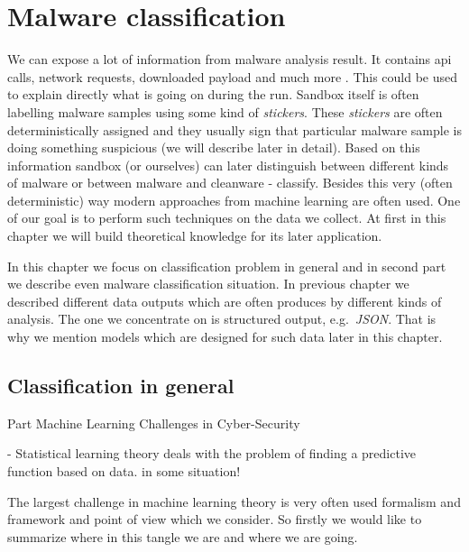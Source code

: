 \chapter{Malware classification} \label{chap:classification}
We can expose a lot of information from malware analysis result. It contains api calls, network requests, downloaded payload and much more . This could be used to explain directly what is going on during the run. Sandbox itself is often labelling malware samples using some kind of \emph{stickers}. These \emph{stickers} are often deterministically assigned and they usually sign that particular malware sample is doing something suspicious (we will describe later in detail). Based on this information sandbox (or ourselves) can later distinguish between different kinds of malware or between malware and cleanware - classify. Besides this very (often deterministic) way modern approaches from machine learning are often used. One of our goal is to perform such techniques on the data we collect. At first in this chapter we will build theoretical knowledge for its later application.

In this chapter we focus on classification problem in general and in second part we describe even malware classification situation. In previous chapter we described different data outputs which are often produces by different kinds of analysis. The one we concentrate on is structured output, e.g.\ \emph{JSON}. That is why we mention models which are designed for such data later in this chapter.

\section{Classification in general}
    Part Machine Learning Challenges in Cyber-Security \cite{Amit2019}


 - Statistical learning theory deals with the problem of finding a predictive function based on data.
 \cite{JasonBrownlee2020} in some situation!

The largest challenge in machine learning theory is very often used formalism and framework and point of view which we consider. So firstly we would like to summarize where in this tangle we are and where we are going.

